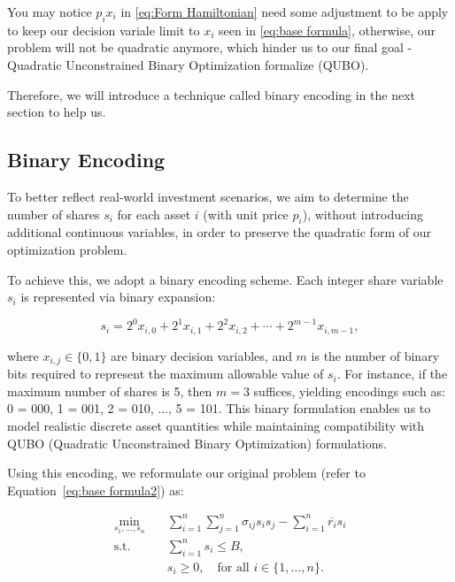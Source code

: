 \documentclass[12pt]{article}
\begin{document}
You may notice $p_{i}x_{i}$ in \ref{eq:Form Hamiltonian} need some adjustment to be apply to keep our decision variale limit to $x_{i}$ seen in \ref{eq:base formula}, otherwise, our problem will not be quadratic anymore, which hinder us to our final goal - Quadratic Unconstrained Binary Optimization formalize (QUBO).

Therefore, we will introduce a technique called binary encoding in the next section to help us.

\subsection{Binary Encoding}

To better reflect real-world investment scenarios, we aim to determine the number of shares $s_i$ for each asset $i$ (with unit price $p_i$), without introducing additional continuous variables, in order to preserve the quadratic form of our optimization problem.

To achieve this, we adopt a binary encoding scheme. Each integer share variable $s_i$ is represented via binary expansion:

\begin{equation}
s_i = 2^{0}x_{i,0} + 2^{1}x_{i,1} + 2^{2}x_{i,2} + \cdots + 2^{m-1}x_{i,m-1},
\end{equation}

where $x_{i,j} \in \{0,1\}$ are binary decision variables, and $m$ is the number of binary bits required to represent the maximum allowable value of $s_i$. For instance, if the maximum number of shares is 5, then $m = 3$ suffices, yielding encodings such as: 0 = 000, 1 = 001, 2 = 010, ..., 5 = 101. This binary formulation enables us to model realistic discrete asset quantities while maintaining compatibility with QUBO (Quadratic Unconstrained Binary Optimization) formulations.

Using this encoding, we reformulate our original problem (refer to Equation~\ref{eq:base formula2}) as:

\begin{equation}
\begin{aligned}
\min_{s_1, \dots, s_n} \quad & \sum_{i=1}^{n} \sum_{j=1}^{n} \sigma_{ij} s_i s_j  - \sum_{i=1}^{n} \overline{r_i} s_i\\
\text{s.t.} \quad & \sum_{i=1}^{n} s_i \leq B, \\
& s_i \geq 0, \quad \text{for all } i \in \{1, \dots, n\}.
\end{aligned}
\label{eq:binary encoded}
\end{equation}
\end{document}
